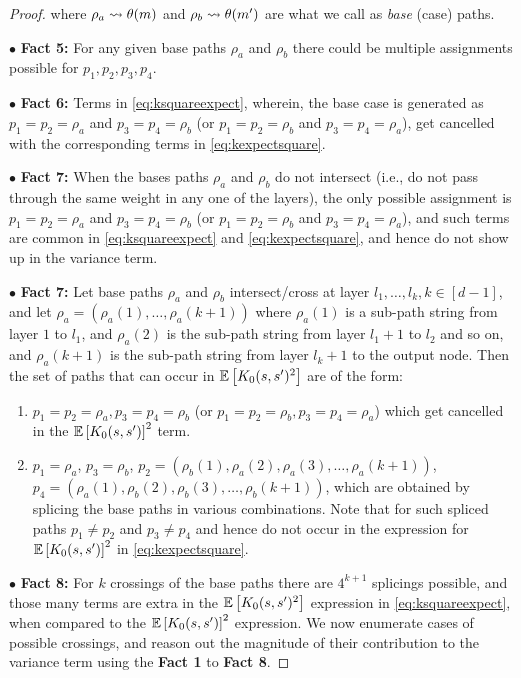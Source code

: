 \begin{proof}
where $\rho_a\rightsquigarrow \theta(m)$ and $\rho_b\rightsquigarrow \theta(m')$ are what we call as \emph{base} (case) paths. 


$\bullet$ \textbf{Fact 5:} For any given base paths $\rho_a$ and $\rho_b$ there could be multiple assignments possible for $p_1,p_2,p_3,p_4$.

$\bullet$ \textbf{Fact 6:}  Terms in \eqref{eq:ksquareexpect}, wherein, the base case is generated as $p_1=p_2=\rho_a$ and $p_3=p_4=\rho_b$ (or $p_1=p_2=\rho_b$ and $p_3=p_4=\rho_a$), get cancelled with the corresponding terms in \eqref{eq:kexpectsquare}.

$\bullet$ \textbf{Fact 7:}  When the bases paths $\rho_a$ and $\rho_b$ do not intersect (i.e., do not pass through the same weight in any one of the layers), the only possible assignment is $p_1=p_2=\rho_a$ and $p_3=p_4=\rho_b$ (or $p_1=p_2=\rho_b$ and $p_3=p_4=\rho_a$), and such terms are common in \eqref{eq:ksquareexpect} and \eqref{eq:kexpectsquare}, and hence do not show up in the variance term.


$\bullet$ \textbf{Fact 7:} Let base paths $\rho_a$ and $\rho_b$ intersect/cross at layer $l_1, \ldots, l_k, k \in [d-1]$, and let $\rho_a=(\rho_a(1),\ldots,\rho_a(k+1))$ where $\rho_a(1)$ is a sub-path string from layer $1$ to $l_1$, and $\rho_a(2)$ is the sub-path string from layer $l_1+1$ to $l_2$ and so on, and $\rho_a(k+1)$ is the sub-path string from layer $l_k+1$ to the output node. Then the set of paths that can occur in $\mathbb{E}\left[K_0(s,s')^2\right]$ are of the form:
\begin{enumerate}
\item $p_1=p_2=\rho_a, p_3=p_4=\rho_b$ (or $p_1=p_2=\rho_b, p_3=p_4=\rho_a$) which get cancelled in the $\mathbb{E}\left[K_0(s,s')\right]^2$ term.
\item $p_1=\rho_a$, $p_3=\rho_b$, $p_2=(\rho_b(1),\rho_a(2),\rho_a(3),\ldots,\rho_a(k+1))$, $p_4=(\rho_a(1),\rho_b(2),\rho_b(3),\ldots,\rho_b(k+1))$, which are obtained by splicing the base paths in various combinations. Note that for such spliced paths $p_1\neq p_2$ and $p_3\neq p_4$ and hence do not occur in the expression for $\mathbb{E}\left[K_0(s,s')\right]^2$ in \eqref{eq:kexpectsquare}.
\end{enumerate}


$\bullet$ \textbf{Fact 8:} For $k$ crossings of the base paths there are $4^{k+1}$ splicings possible, and those many terms are extra in the $\mathbb{E}\left[K_0(s,s')^2\right]$ expression in \eqref{eq:ksquareexpect}, when compared to the $\mathbb{E}\left[K_0(s,s')\right]^2$ expression. We now enumerate cases of possible crossings, and reason out the magnitude of their contribution to the variance term using the \textbf{Fact 1} to \textbf{Fact 8}.



\end{proof}
